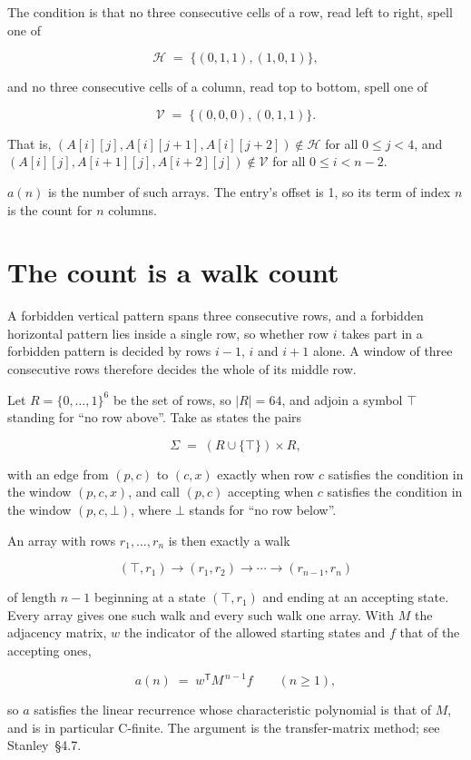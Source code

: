 \documentclass[11pt]{article}
\theoremstyle{definition}
\begin{document}
The condition is that no three consecutive cells of a row, read left to right, spell one of

\[\mathcal{H} \;=\; \{(0,1,1), (1,0,1)\},\]

and no three consecutive cells of a column, read top to bottom, spell one of

\[\mathcal{V} \;=\; \{(0,0,0), (0,1,1)\}.\]

That is, $(A[i][j],A[i][j{+}1],A[i][j{+}2]) \notin \mathcal{H}$ for all $0 \le j < 4$, and $(A[i][j],A[i{+}1][j],A[i{+}2][j]) \notin \mathcal{V}$ for all $0 \le i < n-2$.

$a(n)$ is the number of such arrays. The entry's offset is 1, so its term of index $n$ is the count for $n$ columns.

\section{The count is a walk count}

A forbidden vertical pattern spans three consecutive rows, and a forbidden horizontal pattern lies inside a single row, so whether row $i$ takes part in a forbidden pattern is decided by rows $i-1$, $i$ and $i+1$ alone. A window of three consecutive rows therefore decides the whole of its middle row.

Let $R = \{0,\dots,1\}^{6}$ be the set of rows, so $|R| = 64$, and adjoin a symbol $\top$ standing for ``no row above''. Take as states the pairs

\[\Sigma \;=\; (R \cup \{\top\}) \times R,\]

with an edge from $(p,c)$ to $(c,x)$ exactly when row $c$ satisfies the condition in the window $(p,c,x)$, and call $(p,c)$ accepting when $c$ satisfies the condition in the window $(p,c,\bot)$, where $\bot$ stands for ``no row below''.

An array with rows $r_1,\dots,r_n$ is then exactly a walk

\[(\top,r_1) \to (r_1,r_2) \to \cdots \to (r_{n-1},r_n)\]

of length $n-1$ beginning at a state $(\top,r_1)$ and ending at an accepting state. Every array gives one such walk and every such walk one array. With $M$ the adjacency matrix, $w$ the indicator of the allowed starting states and $f$ that of the accepting ones,

\[a(n) \;=\; w^{\mathsf T} M^{\,n-1} f \qquad (n \ge 1),\]

so $a$ satisfies the linear recurrence whose characteristic polynomial is that of $M$, and is in particular C-finite. The argument is the transfer-matrix method; see Stanley~\S4.7.
\end{document}
